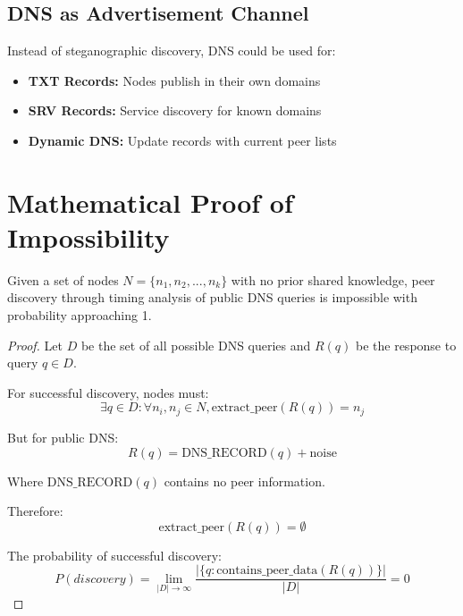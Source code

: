 \documentclass[12pt,a4paper]{article}
\begin{document}
\subsection{DNS as Advertisement Channel}

Instead of steganographic discovery, DNS could be used for:
\begin{itemize}
    \item \textbf{TXT Records:} Nodes publish in their own domains
    \item \textbf{SRV Records:} Service discovery for known domains
    \item \textbf{Dynamic DNS:} Update records with current peer lists
\end{itemize}

\section{Mathematical Proof of Impossibility}

\begin{theorem}
Given a set of nodes $N = \{n_1, n_2, ..., n_k\}$ with no prior shared knowledge, peer discovery through timing analysis of public DNS queries is impossible with probability approaching 1.
\end{theorem}

\begin{proof}
Let $D$ be the set of all possible DNS queries and $R(q)$ be the response to query $q \in D$.

For successful discovery, nodes must:
\begin{equation}
    \exists q \in D : \forall n_i, n_j \in N, \text{extract\_peer}(R(q)) = n_j
\end{equation}

But for public DNS:
\begin{equation}
    R(q) = \text{DNS\_RECORD}(q) + \text{noise}
\end{equation}

Where $\text{DNS\_RECORD}(q)$ contains no peer information.

Therefore:
\begin{equation}
    \text{extract\_peer}(R(q)) = \emptyset
\end{equation}

The probability of successful discovery:
\begin{equation}
    P(discovery) = \lim_{|D| \to \infty} \frac{|\{q : \text{contains\_peer\_data}(R(q))\}|}{|D|} = 0
\end{equation}
\end{proof}
\end{document}
